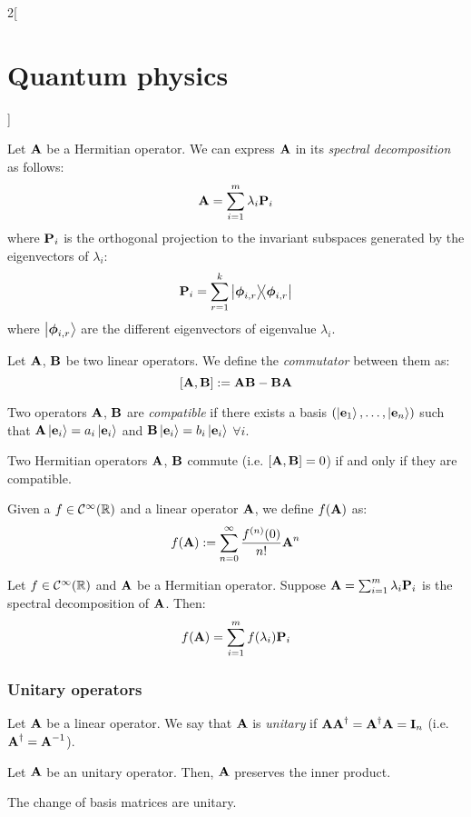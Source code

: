 \documentclass[../../../main_physics.tex]{subfiles}
\begin{document}
\begin{multicols}{2}[\section{Quantum physics}]
\begin{definition}
  \end{definition}
  \begin{proposition}
    Let $\boldsymbol{\mathrm{A}}$ be a Hermitian operator. We can express $\boldsymbol{\mathrm{A}}$ in its \emph{spectral decomposition} as follows: $$\boldsymbol{\mathrm{A}}=\sum_{i=1}^m\lambda_i\boldsymbol{\mathrm{P}}_i$$
    where $\boldsymbol{\mathrm{P}}_i$ is the orthogonal projection to the invariant subspaces generated by the eigenvectors of $\lambda_i$: $$\vf{P}_i=\sum_{r=1}^k\dyad{\vf\phi_{i,r}}{\vf\phi_{i,r}}$$
    where $\ket{\boldsymbol{\mathrm{\phi}}_{i,r}}$ are the different eigenvectors of eigenvalue $\lambda_i$.
  \end{proposition}
  \begin{definition}[Commutator]
    Let $\boldsymbol{\mathrm{A}}$, $\boldsymbol{\mathrm{B}}$ be two linear operators. We define the \emph{commutator} between them as: $$[\boldsymbol{\mathrm{A}},\boldsymbol{\mathrm{B}}]:=\boldsymbol{\mathrm{AB}}-\boldsymbol{\mathrm{BA}}$$
  \end{definition}
  \begin{definition}
    Two operators $\boldsymbol{\mathrm{A}}$, $\boldsymbol{\mathrm{B}}$ are \emph{compatible} if there exists a basis $(\ket{\boldsymbol{\mathrm{e}}_1},\ldots,\ket{\boldsymbol{\mathrm{e}}_n})$ such that $\boldsymbol{\mathrm{A}}\ket{\boldsymbol{\mathrm{e}}_i}=a_i\ket{\boldsymbol{\mathrm{e}}_i}$ and $\boldsymbol{\mathrm{B}}\ket{\boldsymbol{\mathrm{e}}_i}=b_i\ket{\boldsymbol{\mathrm{e}}_i}$ $\forall i$.
  \end{definition}
  \begin{theorem}
    Two Hermitian operators $\boldsymbol{\mathrm{A}}$, $\boldsymbol{\mathrm{B}}$ commute (i.e. $[\boldsymbol{\mathrm{A}},\boldsymbol{\mathrm{B}}]=0$) if and only if they are compatible.
  \end{theorem}
  \begin{definition}
    Given a $f\in\mathcal{C}^\infty(\mathbb{R})$ and a linear operator $\boldsymbol{\mathrm{A}}$, we define $f(\boldsymbol{\mathrm{A}})$ as: $$f(\boldsymbol{\mathrm{A}}):=\sum_{n=0}^\infty \frac{f^{(n)}(0)}{n!}\boldsymbol{\mathrm{A}}^n$$
  \end{definition}
  \begin{proposition}
    Let $f\in\mathcal{C}^\infty(\mathbb{R})$ and $\boldsymbol{\mathrm{A}}$ be a Hermitian operator. Suppose $\boldsymbol{\mathrm{A}}=\sum_{i=1}^m\lambda_i\boldsymbol{\mathrm{P}}_i$ is the spectral decomposition of $\boldsymbol{\mathrm{A}}$. Then: $$f(\boldsymbol{\mathrm{A}})=\sum_{i=1}^mf(\lambda_i)\boldsymbol{\mathrm{P}}_i$$
  \end{proposition}
  \subsubsection{Unitary operators}
  \begin{definition}
    Let $\boldsymbol{\mathrm{A}}$ be a linear operator. We say that $\boldsymbol{\mathrm{A}}$ is \emph{unitary} if $\boldsymbol{\mathrm{A}}\boldsymbol{\mathrm{A}}^\dag=\boldsymbol{\mathrm{A}}^\dag\boldsymbol{\mathrm{A}}=\boldsymbol{\mathrm{I}}_n$ (i.e. $\boldsymbol{\mathrm{A}}^\dag=\boldsymbol{\mathrm{A}}^{-1}$).
  \end{definition}
  \begin{proposition}
    Let $\boldsymbol{\mathrm{A}}$ be an unitary operator. Then, $\boldsymbol{\mathrm{A}}$ preserves the inner product.
  \end{proposition}
  \begin{proposition}
    The change of basis matrices are unitary.
  \end{proposition}

\end{multicols}
\end{document}
